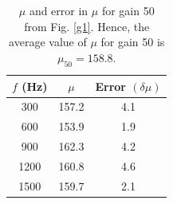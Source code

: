 \begin{table}[H]
    \centering
    \begin{tabular}{|c|c|c|} \hline
        $f$ (Hz) &   $\mu$ & Error $(\delta \mu)$ \\\hline
      300 &   157.2 & 4.1 \\
      600 &   153.9 & 1.9 \\
      900 &   162.3 & 4.2 \\
     1200 &   160.8 & 4.6 \\
     1500 &   159.7 & 2.1 \\\hline    
    \end{tabular}
    \caption{$\mu$ and error in $\mu$ for gain 50 from Fig. \ref{g1}. Hence, the average value of $\mu$ for gain 50 is ${ \mu_{50} = 158.8}$.}
\end{table}


